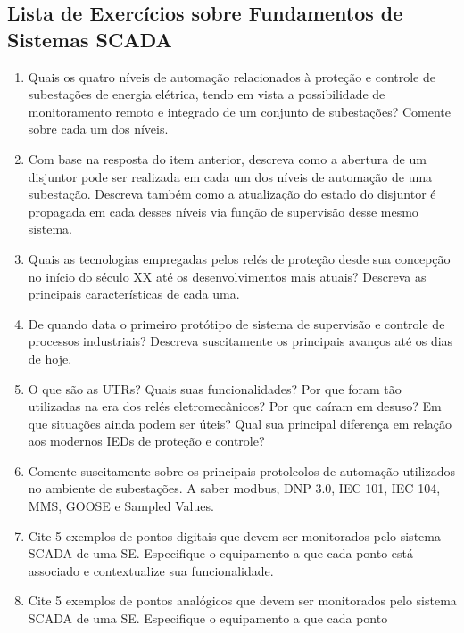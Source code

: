 
\centering

\hypertarget{lista-de-exercuxedcios-sobre-fundamentos-de-sistemas-scada}{%
\subsection{Lista de Exercícios sobre Fundamentos de Sistemas
SCADA}\label{lista-de-exercuxedcios-sobre-fundamentos-de-sistemas-scada}}


\begin{enumerate}
\def\labelenumi{\arabic{enumi}.}
\item
  Quais os quatro níveis de automação relacionados à proteção e controle
  de subestações de energia elétrica, tendo em vista a possibilidade de
  monitoramento remoto e integrado de um conjunto de subestações?
  Comente sobre cada um dos níveis.
\item
  Com base na resposta do item anterior, descreva como a abertura de um
  disjuntor pode ser realizada em cada um dos níveis de automação de uma
  subestação. Descreva também como a atualização do estado do disjuntor
  é propagada em cada desses níveis via função de supervisão desse mesmo
  sistema.
\item
  Quais as tecnologias empregadas pelos relés de proteção desde sua
  concepção no início do século XX até os desenvolvimentos mais atuais?
  Descreva as principais características de cada uma.
\item
  De quando data o primeiro protótipo de sistema de supervisão e
  controle de processos industriais? Descreva suscitamente os principais
  avanços até os dias de hoje.
\item
  O que são as UTRs? Quais suas funcionalidades? Por que foram tão
  utilizadas na era dos relés eletromecânicos? Por que caíram em desuso?
  Em que situações ainda podem ser úteis? Qual sua principal diferença
  em relação aos modernos IEDs de proteção e controle?
\item
  Comente suscitamente sobre os principais protolcolos de automação
  utilizados no ambiente de subestações. A saber modbus, DNP 3.0, IEC
  101, IEC 104, MMS, GOOSE e Sampled Values.
\item
  Cite 5 exemplos de pontos digitais que devem ser monitorados pelo
  sistema SCADA de uma SE. Especifique o equipamento a que cada ponto
  está associado e contextualize sua funcionalidade.
\item
  Cite 5 exemplos de pontos analógicos que devem ser monitorados pelo
  sistema SCADA de uma SE. Especifique o equipamento a que cada ponto

\end{enumerate}
